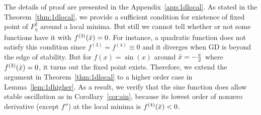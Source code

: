 \documentclass{article}
\theoremstyle{plain}
\theoremstyle{remark}
\newcommand{\T}[1]{^{(#1)}}
\begin{document}
The details of proof are presented in the Appendix~\ref{app:1dlocal}.
As stated in the Theorem~\ref{thm:1dlocal}, we provide a sufficient condition for existence of fixed point of $F^2_\eta$ around a local minima. But still we cannot tell whether or not some functions have it with $f\T{3}(\Bar{x})=0$. For instance, a quadratic function does not satisfy this condition since $f^{(3)} = f^{(4)} \equiv 0$ and it diverges when GD is beyond the edge of stability. But for $f(x)=\sin(x)$ around $\Bar{x}=-\frac{\pi}{2}$ where $f\T{3}(\Bar{x})=0$, it turns out the fixed point exists. Therefore, we extend the argument in Theorem~\ref{thm:1dlocal} to a higher order case in Lemma~\ref{lem:1dhigher}.
As a result, we verify that the sine function does allow stable oscillation as in Corollary~\ref{cor:sin}, because its lowest order of nonzero derivative (except $f''$) at the local minima is $f\T{4}(\Bar{x})<0$. 
\end{document}
